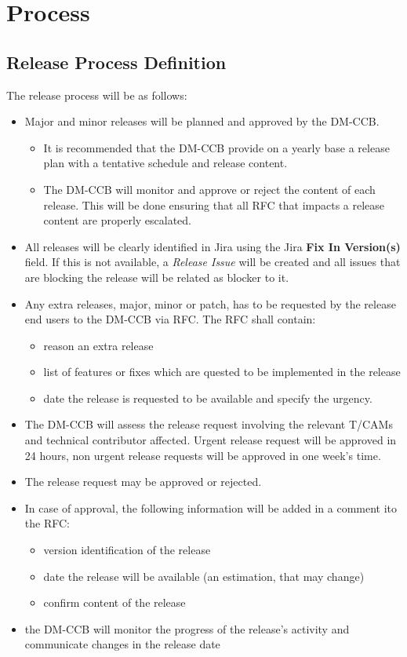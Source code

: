 \section{Process} \label{sec:process}

\subsection{Release Process Definition}

The release process will be as follows:

\begin{itemize}
\item Major and minor releases will be planned and approved by the DM-CCB. 
\begin{itemize}
  \item It is recommended that the DM-CCB provide on a yearly base a release plan with a tentative schedule and release content.
  \item The DM-CCB will monitor and approve or reject the content of each release. This will be done ensuring that all RFC that impacts a release content are properly escalated.
\end{itemize}
\item All releases will be clearly identified in Jira using the Jira \textbf{Fix In Version(s)} field. 
If this is not available, a \textit{Release Issue} will be created and all issues that are blocking the release will be related as blocker to it. 
\item Any extra releases, major, minor or patch, has to be requested by the release end users to the DM-CCB via RFC. The RFC shall contain:
\begin{itemize}
  \item reason an extra release
  \item list of features or fixes which are quested to be implemented in the release
  \item date the release is requested to be available and specify the urgency.
\end{itemize}
\item The DM-CCB will assess the release request involving the relevant T/CAMs and technical contributor affected. 
Urgent release request will be approved in 24 hours, non urgent release requests will be approved in one week's time.
\item The release request may be approved or rejected.
\item In case of approval, the following information will be added in a comment ito the RFC:
\begin{itemize}
  \item version identification of the release
  \item date the release will be available (an estimation, that may change)
  \item confirm content of the release
\end{itemize}
\item the DM-CCB will monitor the progress of the release's activity and communicate changes in the release date
\end{itemize}


